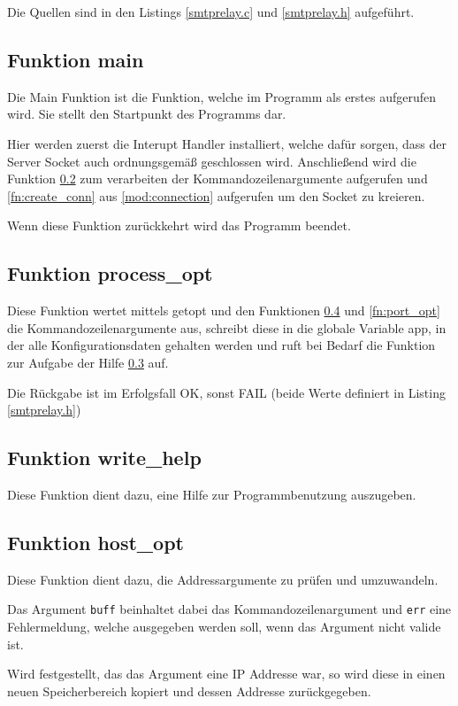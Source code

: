 \documentclass[pdftex,final,a4paper,10pt,notitlepage,halfparskip]{scrreprt}
\begin{document}
Die Quellen sind in den Listings \ref{smtprelay.c} und \ref{smtprelay.h} aufgeführt.

\subsection{Funktion main}\label{fn:main}
Die Main Funktion ist die Funktion, welche im Programm als erstes aufgerufen wird. Sie stellt den Startpunkt des Programms dar.

Hier werden zuerst die Interupt Handler installiert, welche dafür sorgen, dass der Server Socket auch ordnungsgemäß geschlossen wird. Anschließend wird die Funktion \ref{fn:process_opt} zum verarbeiten der Kommandozeilenargumente aufgerufen und \ref{fn:create_conn} aus \ref{mod:connection} aufgerufen um den Socket zu kreieren.

Wenn diese Funktion zurückkehrt wird das Programm beendet.

\subsection{Funktion process\_opt}\label{fn:process_opt}
Diese Funktion wertet mittels getopt und den Funktionen \ref{fn:host_opt} und \ref{fn:port_opt} die Kommandozeilenargumente aus, schreibt diese in die globale Variable app, in der alle Konfigurationsdaten gehalten werden und ruft bei Bedarf die Funktion zur Aufgabe der Hilfe \ref{fn:write_help} auf.

Die Rückgabe ist im Erfolgsfall OK, sonst FAIL (beide Werte definiert in Listing \ref{smtprelay.h})

\subsection{Funktion write\_help}\label{fn:write_help}
Diese Funktion dient dazu, eine Hilfe zur Programmbenutzung auszugeben.

\subsection{Funktion host\_opt}\label{fn:host_opt}
Diese Funktion dient dazu, die Addressargumente zu prüfen und umzuwandeln.

Das Argument \texttt{buff} beinhaltet dabei das Kommandozeilenargument und \texttt{err} eine Fehlermeldung, welche ausgegeben werden soll, wenn das Argument nicht valide ist.

Wird festgestellt, das das Argument eine IP Addresse war, so wird diese in einen neuen Speicherbereich kopiert und dessen Addresse zurückgegeben.
\end{document}
